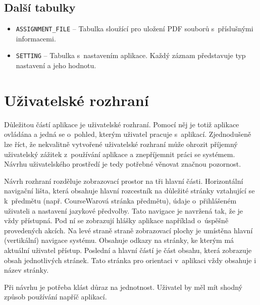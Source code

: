 \documentclass[czech,BP]{thesiskiv}
\begin{document}
		\subsection{Další tabulky}
			\begin{itemize}
				\item \texttt{ASSIGNMENT\_FILE} -- Tabulka sloužící pro uložení PDF souborů s~příslušnými informacemi.
				\item \texttt{SETTING} -- Tabulka s~nastavením aplikace. Každý záznam představuje typ nastavení a jeho hodnotu.
			\end{itemize}
	\section{Uživatelské rozhraní}
	\par Důležitou částí aplikace je uživatelské rozhraní. Pomocí něj je totiž aplikace ovládána a jedná se o~pohled, kterým uživatel pracuje s~aplikací. Zjednodušeně lze říct, že nekvalitně vytvořené uživatelské rozhraní může ohrozit příjemný uživatelský zážitek z~používání aplikace a znepříjemnit práci se systémem. Návrhu uživatelského prostředí je tedy potřebné věnovat značnou pozornost.	
	\par Návrh rozhraní rozděluje zobrazovací prostor na tři hlavní části. Horizontální navigační lišta, která obsahuje hlavní rozcestník na důležité stránky vztahující se k~předmětu (např. CourseWarová stránka předmětu), údaje o~přihlášeném uživateli a nastavení jazykové předvolby. Tato navigace je navržená tak, že je vždy přístupná. Pod ní se zobrazují hlášky aplikace například o~úspěšně provedených akcích. Na levé straně straně zobrazovací plochy je umístěna hlavní (vertikální) navigace systému. Obsahuje odkazy na stránky, ke kterým má aktuální uživatel přístup. Poslední a hlavní částí je část obsahu, která zobrazuje obsah jednotlivých stránek. Tato stránka pro orientaci v~aplikaci vždy obsahuje i název stránky.
	\par Při návrhu je potřeba klást důraz na jednotnost. Uživatel by měl mít shodný způsob používání napříč aplikací.
	
\end{document}
